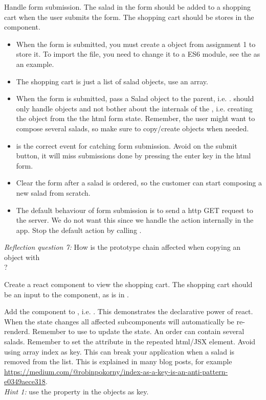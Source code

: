 \documentclass[fleqn, article, a4paper]{memoir}
\begin{document}
\begin{Assignments}
\item Handle form submission. The salad in the form should be added to a shopping cart when the user submits the form. The shopping cart should be stores in the  component.
\begin{itemize}
  \item When the form is submitted, you must create a  object from assignment 1 to store it. To import the file, you need to change it to a ES6 module, see the  as an example.
  \item The shopping cart is just a list of salad objects, use an array.
  \item When the form is submitted, pass a Salad object to the parent, i.e. .  should only handle  objects and not bother about the internals of the , i.e. creating the object from the the html form state. Remember, the user might want to compose several salads, so make sure to copy/create objects when needed.
  \item {} is the correct event for catching form submission. Avoid  on the submit button, it will miss submissions done by pressing the enter key in the html form.
  \item Clear the form after a salad is ordered, so the customer can start composing a new salad from scratch.
  \item The default behaviour of form submission is to send a http GET request to the server. We do not want this since we handle the action internally in the app. Stop the default action by calling .
\end{itemize}
\emph{Reflection question 7:} How is the prototype chain affected when copying an object with \\?

\item Create a react component to view the shopping cart. The shopping cart should be an input to the component, as  is in .

\item Add the  component to , i.e. . This demonstrates the declarative power of react. When the state changes all affected subcomponents will automatically be re-renderd. Remember to use  to update the state.
\newline
\newline
An order can contain several salads. Remember to set the  attribute in the repeated html/JSX element. Avoid using array index as key. This can break your application when a salad is removed from the list. This is explained in many blog posts, for example \url{https://medium.com/@robinpokorny/index-as-a-key-is-an-anti-pattern-e0349aece318}.
\\ \noindent \emph{Hint 1:} use the  property in the  objects as key.


\end{Assignments}
\end{document}
